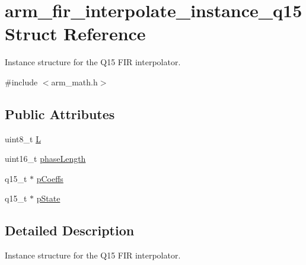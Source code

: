 \hypertarget{structarm__fir__interpolate__instance__q15}{\section{arm\-\_\-fir\-\_\-interpolate\-\_\-instance\-\_\-q15 Struct Reference}
\label{structarm__fir__interpolate__instance__q15}
}


Instance structure for the Q15 F\-I\-R interpolator.  




{\ttfamily \#include $<$arm\-\_\-math.\-h$>$}

\subsection*{Public Attributes}
\begin{DoxyCompactItemize}
\item 
uint8\-\_\-t \hyperlink{structarm__fir__interpolate__instance__q15_a5431bdc079e72a973b51d359f7f13603}{L}
\item 
uint16\-\_\-t \hyperlink{structarm__fir__interpolate__instance__q15_ad5178a02a697a77e0d0e60705d9f0a19}{phase\-Length}
\item 
q15\-\_\-t $\ast$ \hyperlink{structarm__fir__interpolate__instance__q15_a767d91d61d4c0beeddd4325d28d28e24}{p\-Coeffs}
\item 
q15\-\_\-t $\ast$ \hyperlink{structarm__fir__interpolate__instance__q15_a26b864363fa47954248f2590e3a82a3c}{p\-State}
\end{DoxyCompactItemize}


\subsection{Detailed Description}
Instance structure for the Q15 F\-I\-R interpolator. 


